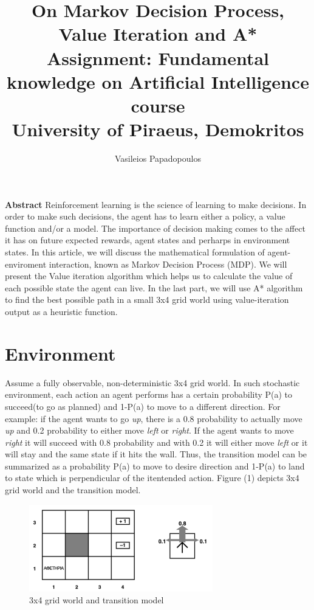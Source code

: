 \documentclass[10pt,a4paper,twocolumn]{article}
\title{%
		On Markov Decision Process, Value Iteration and A* \\
	\large Assignment: Fundamental knowledge on Artificial Intelligence course\\
			University of Piraeus, Demokritos}
\author{Vasileios Papadopoulos}
\begin{document}
	\maketitle
	
	\textbf{Abstract}
	Reinforcement learning is the science of learning to make decisions. In order to make such decisions, the agent has to learn either a policy,	a value function and/or a model. The importance of decision making comes to the affect it has on future expected rewards, agent states and perharps in environment states. In this article, we will discuss the mathematical formulation of agent-enviroment interaction, known as Markov Decision Process (MDP). We will present the Value iteration algorithm which helps us to calculate the value of each possible state the agent can live. In the last part, we will use A* algorithm to find the best possible path in a small 3x4 grid world using value-iteration output as a heuristic function.
	
	
	\section{Environment}
	
	Assume a fully observable, non-deterministic 3x4 grid world. In such stochastic environment, 
	each action an agent performs has a certain probability P(a) to succeed(to go as planned) and 1-P(a) to move to a different direction. 
	For example: if the agent wants to go \textit{up}, there is a 0.8 probability to actually move \textit{up} and 0.2 probability to either move \textit{left} or \textit{right}. If the agent wants to move \textit{right} it will succeed with 0.8 probability and with 0.2 it will either move \textit{left} or it will stay and the same state if it hits the wall. Thus, the transition model can be summarized as a probability P(a) to move to desire direction and 1-P(a) to land to state which is perpendicular of the itentended action. Figure (1) depicts 3x4 grid world and the transition model.
\begin{figure}[ht!]
	\centering
	\includegraphics[width=80mm]{grid_world}
	\caption{3x4 grid world and transition model \label{overflow}}
\end{figure}
	
\end{document}
